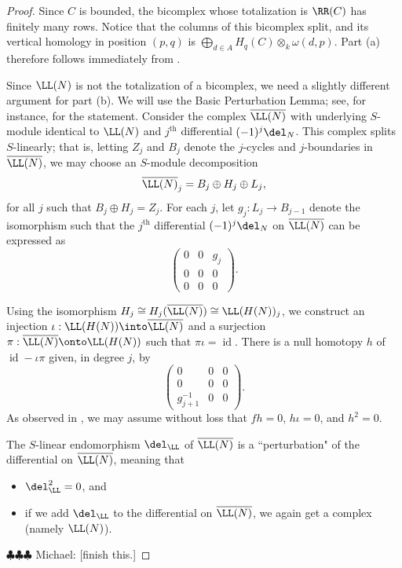 \documentclass[12pt]{amsart}
\theoremstyle{definition}
\theoremstyle{remark}
\newcommand{\id}{\operatorname{id}}
\newcommand{\michael}[1]{{\color{red} \sf $\clubsuit\clubsuit\clubsuit$ Michael: [#1]}}
\def\on{\operatorname}
\def\om{\omega}
\def\th{\on{th}}
\def\om{\omega}
\begin{document}
\begin{proof}
Since $C$ is bounded, the bicomplex whose totalization is $\RR(C)$ has finitely many rows. Notice that the columns of this bicomplex split, and its vertical homology in position $(p,q)$ is $\bigoplus_{d \in A} H_q(C) \otimes_k \om(d, p)$. Part (a) therefore follows immediately from \cite[Lemma 3.5]{EFS}.

Since $\LL(N)$ is not the totalization of a bicomplex, we need a slightly different argument for part (b). We will use the Basic Perturbation Lemma; see, for instance, \cite[Lemma A.4]{coanda} for the statement. Consider the complex $\overline{\LL(N)}$ with underlying $S$-module identical to $\LL(N)$ and $j^{\th}$ differential $(-1)^j \del_N$. This complex splits $S$-linearly; that is, letting $Z_j$ and $B_j$ denote the $j$-cycles and $j$-boundaries in $\overline{\LL(N)}$, we may choose an $S$-module decomposition
$$
\overline{\LL(N)}_j = B_j \oplus H_j \oplus L_j,
$$
for all $j$ such that $B_j \oplus H_j = Z_j$. For each $j$, let $g_j : L_j \to B_{j -1}$ denote the isomorphism such that the $j^{\th}$ differential $(-1)^j \del_{N}$ on $\overline{\LL(N)}$ can be expressed as
$$
\begin{pmatrix}
0 & 0 & g_j \\
0 & 0 & 0 \\
0 & 0 & 0
\end{pmatrix}.
$$

Using the isomorphism $H_j \cong H_j(\overline{\LL(N)}) \cong \LL(H(N))_j$, we construct an injection $\iota : \LL(H(N)) \into \overline{\LL(N)}$ and a surjection $\pi : \overline{\LL(N)} \onto \LL(H(N))$ such that $\pi \iota = \id$. There is a null homotopy $h$ of $\id  - \iota  \pi$ given, in degree $j$, by 
$$
\begin{pmatrix}
0 & 0 & 0 \\
0 & 0 & 0\\
g_{j+1}^{-1} & 0 & 0
\end{pmatrix}.
$$
As observed in \cite[Section 2.1]{LS}, we may assume without loss that $f  h = 0$, $h \iota = 0$, and $h^2 = 0$. 

The $S$-linear endomorphism $\del_\LL$ of $\overline{\LL(N)}$ is a ``perturbation" of the differential on $\overline{\LL(N)}$, meaning that 
\begin{itemize}
\item $\del_\LL^2 = 0$, and
\item if we add $\del_\LL$ to the differential on $\overline{\LL(N)}$, we again get a complex (namely $\LL(N)$). 
\end{itemize}
\michael{finish this.}
\end{proof}
\end{document}
